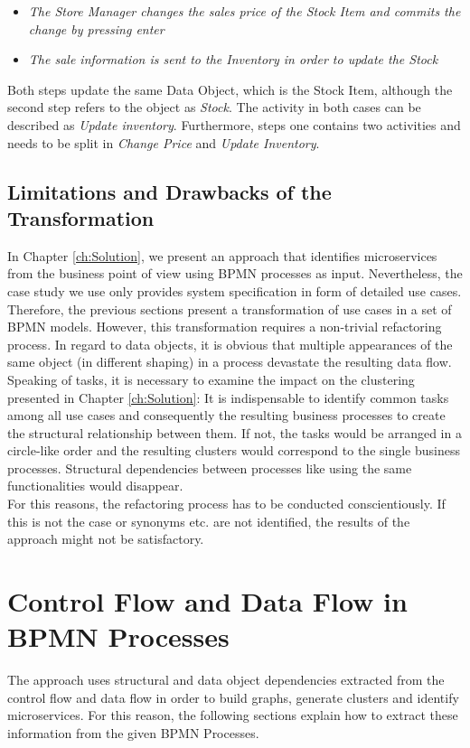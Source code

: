 \begin{itemize}
	\item \textit{The Store Manager changes the sales price of the Stock Item and commits the change by pressing enter}
	\item \textit{The sale information is sent to the Inventory in order to update the Stock}
\end{itemize}
Both steps update the same Data Object, which is the Stock Item, although the second step refers to the object as \textit{Stock}. The activity in both cases can be described as \textit{Update inventory}. Furthermore, steps one contains two activities and needs to be split in \textit{Change Price} and \textit{Update Inventory}.

\subsection{Limitations and Drawbacks of the Transformation}
In Chapter \ref{ch:Solution}, we present an approach that identifies microservices from the business point of view using BPMN processes as input. Nevertheless, the case study we use only provides system specification in form of detailed use cases. Therefore, the previous sections present a transformation of use cases in a set of BPMN models. However, this transformation requires a non-trivial refactoring process. In regard to data objects, it is obvious that multiple appearances of the same object (in different shaping) in a process devastate the resulting data flow. Speaking of tasks, it is necessary to examine the impact on the clustering presented in Chapter \ref{ch:Solution}: It is indispensable to identify common tasks among all use cases and consequently the resulting business processes to create the structural relationship between them. If not, the tasks would be arranged in a circle-like order and the resulting clusters would correspond to the single business processes. Structural dependencies between processes like using the same functionalities would disappear.\\
For this reasons, the refactoring process has to be conducted 
conscientiously. If this is not the case or synonyms etc. are not identified, the results of the approach might not be satisfactory.




\section{Control Flow and Data Flow in BPMN Processes}
\label{ch:PrepApproach:ControlDataFlowBPMNProcess}
The approach uses structural and data object dependencies extracted from the control flow and data flow in order to build graphs, generate clusters and identify microservices. For this reason, the following sections explain how to extract these information from the given BPMN Processes. 

